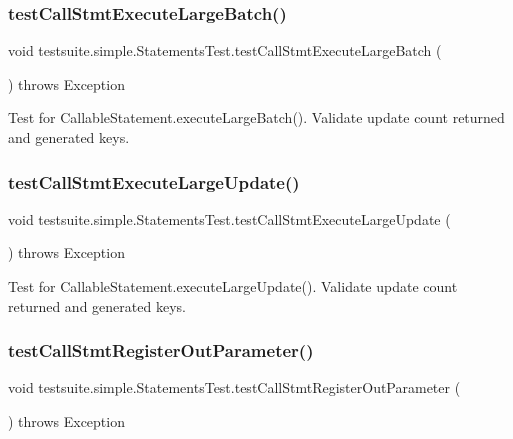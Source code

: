 \subsubsection{\texorpdfstring{test\+Call\+Stmt\+Execute\+Large\+Batch()}{testCallStmtExecuteLargeBatch()}}
{\footnotesize\ttfamily void testsuite.\+simple.\+Statements\+Test.\+test\+Call\+Stmt\+Execute\+Large\+Batch (\begin{DoxyParamCaption}{ }\end{DoxyParamCaption}) throws Exception}

Test for Callable\+Statement.\+execute\+Large\+Batch(). Validate update count returned and generated keys. \mbox{\label{classtestsuite_1_1simple_1_1_statements_test_ade0670c0a2b079707bef4b4c243518c3}} 
\subsubsection{\texorpdfstring{test\+Call\+Stmt\+Execute\+Large\+Update()}{testCallStmtExecuteLargeUpdate()}}
{\footnotesize\ttfamily void testsuite.\+simple.\+Statements\+Test.\+test\+Call\+Stmt\+Execute\+Large\+Update (\begin{DoxyParamCaption}{ }\end{DoxyParamCaption}) throws Exception}

Test for Callable\+Statement.\+execute\+Large\+Update(). Validate update count returned and generated keys. \mbox{\label{classtestsuite_1_1simple_1_1_statements_test_ac1ce052f2d7090889dc501304aebccee}} 
\subsubsection{\texorpdfstring{test\+Call\+Stmt\+Register\+Out\+Parameter()}{testCallStmtRegisterOutParameter()}}
{\footnotesize\ttfamily void testsuite.\+simple.\+Statements\+Test.\+test\+Call\+Stmt\+Register\+Out\+Parameter (\begin{DoxyParamCaption}{ }\end{DoxyParamCaption}) throws Exception}

